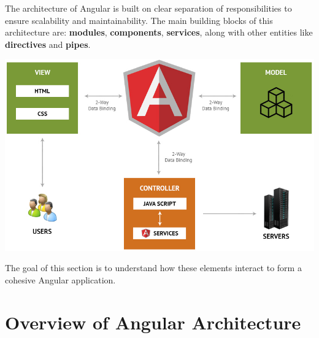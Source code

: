 \documentclass{article}
\begin{document}
The architecture of Angular is built on clear separation of responsibilities to ensure scalability and maintainability. The main building blocks of this architecture are: \textbf{modules}, \textbf{components}, \textbf{services}, along with other entities like \textbf{directives} and \textbf{pipes}.
\begin{tcolorbox}[colframe=black!70, colback=white, title=Figure 2: Angular Architecture, fonttitle=\bfseries]
\centering
\includegraphics[width=\textwidth]{images/MVC-Architecture-is-Perfect.jpg}
\end{tcolorbox}

The goal of this section is to understand how these elements interact to form a cohesive Angular application.

\section{Overview of Angular Architecture}
\end{document}
